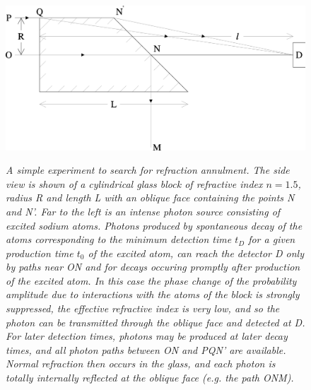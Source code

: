 \documentclass [12pt]{article}
\begin{document}
{\begin{figure}[htbp]
\begin{center}
\hspace*{-0.5cm}\mbox{
\includegraphics[width=5in]{poptf4c.eps}}
\caption{{\sl A simple experiment to search for refraction annulment.
 The side view is shown of a cylindrical glass block of
   refractive index $n = 1.5$, radius R and length L 
 with an oblique face
 containing the points N and N'. Far to the left is 
 an intense photon source consisting of excited sodium atoms.
 Photons produced by spontaneous decay of the atoms
 corresponding to the minimum detection time $t_D$ for a given production
 time $t_0$ of the excited atom,
 can reach the detector D only by paths near ON and for decays occuring
 promptly after production of the excited atom. In this case the phase
 change of the probability amplitude due to interactions with the atoms of 
 the block is strongly suppressed, the effective refractive index is very low, and so
 the photon
 can be transmitted through the oblique face and detected at D. For later detection times, photons
 may be produced
 at later decay times, and all photon paths between ON and PQN' are available.
 Normal refraction then occurs in the glass, and each photon is 
 totally internally reflected at the oblique face (e.g. the path ONM).}} 
\label{fig-fig4}
\end{center}
\end{figure}

}
\end{document}

